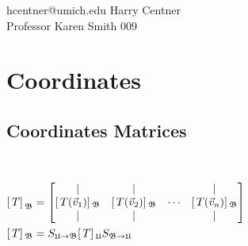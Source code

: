 \documentclass[12pt]{article}
\renewcommand{\maketitle}{%
\begin {flushleft}{\fontsize{25pt}{33pt}\bfseries
\theauthor}}
\begin{document}
\author{Math 217 Exam Two Notes}
\date{\today}
\fancyhead{}

\maketitle

\vspace{.7em} %

\large{hcentner@umich.edu \hfill Harry Centner} \\
\hfill Professor Karen Smith 009


\end{flushleft}

\vspace{-2em}

\section{Coordinates}
\begin{center} \end{center}
	\subsection{Coordinates Matrices}
	\begin{center} \end{center}
	
	\begin{tcolorbox}
	\\
	\begin{center}
	$\begin{aligned}
	\text{[\,}T\text{]\,}_\mathfrak{B} &=  \begin{bmatrix}  |&| & & | \\ [\,T(\vec{v}_1)]\,_\mathfrak{B} & [\,T(\vec{v}_2)]\,_\mathfrak{B}  & \cdots & [\,T(\vec{v}_n)]\,_\mathfrak{B}  \\ |&|& & |\end{bmatrix} \\
	[\,T]\,_\mathfrak{B} &= S_{\mathfrak{U}\rightarrow\mathfrak{B}} [\,T]\,_\mathfrak{U} S_{\mathfrak{B}\rightarrow\mathfrak{U}}  
	\end{aligned}$
	\end{center}
	\end{tcolorbox}
	
\end{document}
